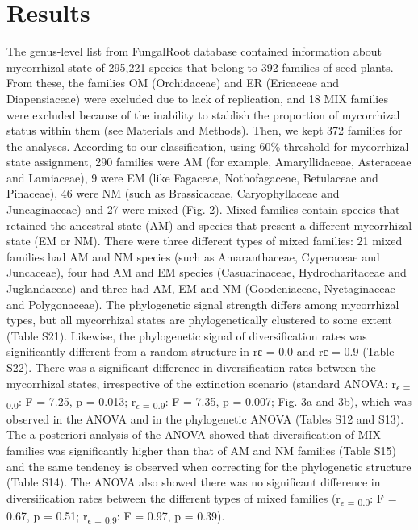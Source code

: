 \documentclass[12pt,]{article}
\begin{document}
\hypertarget{results}{%
\section{Results}\label{results}}

The genus-level list from FungalRoot database contained information
about mycorrhizal state of 295,221 species that belong to 392 families
of seed plants. From these, the families OM (Orchidaceae) and ER
(Ericaceae and Diapensiaceae) were excluded due to lack of replication,
and 18 MIX families were excluded because of the inability to stablish
the proportion of mycorrhizal status within them (see Materials and
Methods). Then, we kept 372 families for the analyses. According to our
classification, using 60\% threshold for mycorrhizal state assignment,
290 families were AM (for example, Amaryllidaceae, Asteraceae and
Lamiaceae), 9 were EM (like Fagaceae, Nothofagaceae, Betulaceae and
Pinaceae), 46 were NM (such as Brassicaceae, Caryophyllaceae and
Juncaginaceae) and 27 were mixed (Fig. 2). Mixed families contain
species that retained the ancestral state (AM) and species that present
a different mycorrhizal state (EM or NM). There were three different
types of mixed families: 21 mixed families had AM and NM species (such
as Amaranthaceae, Cyperaceae and Juncaceae), four had AM and EM species
(Casuarinaceae, Hydrocharitaceae and Juglandaceae) and three had AM, EM
and NM (Goodeniaceae, Nyctaginaceae and Polygonaceae). The phylogenetic
signal strength differs among mycorrhizal types, but all mycorrhizal
states are phylogenetically clustered to some extent (Table S21).
Likewise, the phylogenetic signal of diversification rates was
significantly different from a random structure in rɛ = 0.0 and rɛ = 0.9
(Table S22). There was a significant difference in diversification rates
between the mycorrhizal states, irrespective of the extinction scenario
(standard ANOVA: r\textsubscript{$\epsilon$ = 0.0}: F = 7.25, p = 0.013;
r\textsubscript{$\epsilon$ = 0.9}: F = 7.35, p = 0.007; Fig. 3a and 3b),
which was observed in the ANOVA and in the phylogenetic ANOVA (Tables
S12 and S13). The a posteriori analysis of the ANOVA showed that
diversification of MIX families was significantly higher than that of AM
and NM families (Table S15) and the same tendency is observed when
correcting for the phylogenetic structure (Table S14). The ANOVA also
showed there was no significant difference in diversification rates
between the different types of mixed families
(r\textsubscript{$\epsilon$ = 0.0}: F = 0.67, p = 0.51;
r\textsubscript{$\epsilon$ = 0.9}: F = 0.97, p = 0.39).
\end{document}
